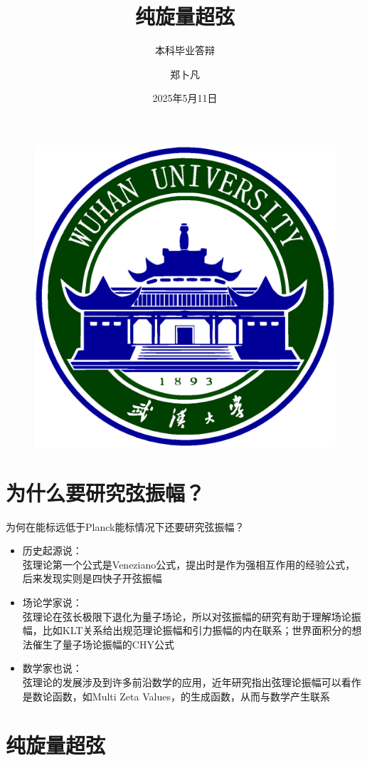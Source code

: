 \documentclass{beamer}
\author{郑卜凡}
\title{纯旋量超弦}
\subtitle{本科毕业答辩}
\institute{指导老师：杜一剑}
\date{2025年5月11日}
\begin{document}
\kaishu
\begin{frame}
	\titlepage
	\begin{figure}[htpb]
		\begin{center}
			\includegraphics[width=0.2\linewidth]{pic/whulogo.eps}
		\end{center}
	\end{figure}
\end{frame}
\begin{frame}
\tableofcontents[sectionstyle=show,subsectionstyle=show/shaded/hide,subsubsectionstyle=show/shaded/hide]
\end{frame}


\section{为什么要研究弦振幅？}

\begin{frame}{为何在能标远低于Planck能标情况下还要研究弦振幅？}
\begin{itemize}
\item {\color{WHU} 历史起源说：}\\
	弦理论第一个公式是Veneziano公式，提出时是作为强相互作用的经验公式，后来发现实则是四快子开弦振幅
\item {\color{WHU} 场论学家说：}\\
	弦理论在弦长极限下退化为量子场论，所以对弦振幅的研究有助于理解场论振幅，比如KLT关系\cite{Kawai:1985xq}给出规范理论振幅和引力振幅的内在联系；世界面积分的想法催生了量子场论振幅的CHY公式\cite{Cachazo:2013iea,Cachazo:2013hca}
\item {\color{WHU} 数学家也说}：\\
	弦理论的发展涉及到许多前沿数学的应用，近年研究指出弦理论振幅可以看作是数论函数，如Multi Zeta Values，的生成函数，从而与数学产生联系\cite{Broedel:2013aza}
\end{itemize}
\end{frame}

\section{纯旋量超弦}
\end{document}
